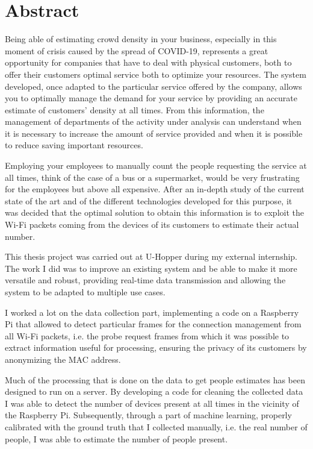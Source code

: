 \chapter*{Abstract} %
\label{abstract}

\vspace{0.4 cm} 

Being able of estimating crowd density in your business, especially in this moment of crisis caused by the spread of COVID-19, represents a great opportunity for companies that have to deal with physical customers, both to offer their customers optimal service both to optimize your resources. The system developed, once adapted to the particular service offered by the company, allows you to optimally manage the demand for your service by providing an accurate estimate of customers' density at all times. From this information, the management of departments of the activity under analysis can understand when it is necessary to increase the amount of service provided and when it is possible to reduce saving important resources.

Employing your employees to manually count the people requesting the service at all times, think of the case of a bus or a supermarket, would be very frustrating for the employees but above all expensive. After an in-depth study of the current state of the art and of the different technologies developed for this purpose, it was decided that the optimal solution to obtain this information is to exploit the Wi-Fi packets coming from the devices of its customers to estimate their actual number.

This thesis project was carried out at U-Hopper during my external internship. The work I did was to improve an existing system and be able to make it more versatile and robust, providing real-time data transmission and allowing the system to be adapted to multiple use cases.

I worked a lot on the data collection part, implementing a code on a Raspberry Pi that allowed to detect particular frames for the connection management from all Wi-Fi packets, i.e. the probe request frames from which it was possible to extract information useful for processing, ensuring the privacy of its customers by anonymizing the MAC address.

Much of the processing that is done on the data to get people estimates has been designed to run on a server. By developing a code for cleaning the collected data I was able to detect the number of devices present at all times in the vicinity of the Raspberry Pi. Subsequently, through a part of machine learning, properly calibrated with the ground truth that I collected manually, i.e. the real number of people, I was able to estimate the number of people present.

